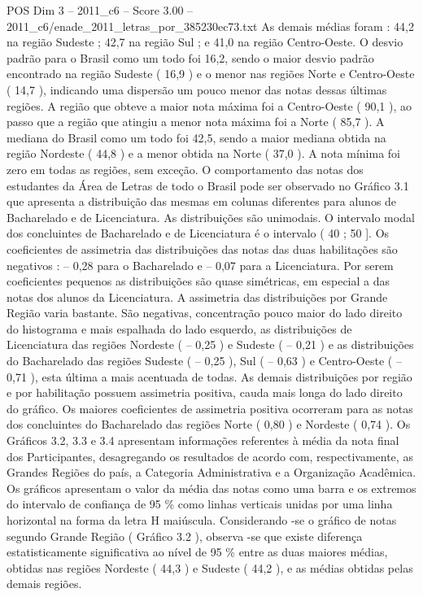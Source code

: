 \begin{textsample}{POS Dim 3 – 2011\_c6 – Score 3.00 – 2011\_c6/enade\_2011\_letras\_por\_385230ec73.txt}
As demais médias foram : 44,2 na região Sudeste ; 42,7 na região Sul ; e 41,0 na região Centro-Oeste.
O desvio padrão para o Brasil como um todo foi 16,2, sendo o maior desvio padrão encontrado na região Sudeste ( 16,9 ) e o menor nas regiões Norte e Centro-Oeste ( 14,7 ), indicando uma dispersão um pouco menor das notas dessas últimas regiões.
A região que obteve a maior nota máxima foi a Centro-Oeste ( 90,1 ), ao passo que a região que atingiu a menor nota máxima foi a Norte ( 85,7 ).
A mediana do Brasil como um todo foi 42,5, sendo a maior mediana obtida na região Nordeste ( 44,8 ) e a menor obtida na Norte ( 37,0 ).
A nota mínima foi zero em todas as regiões, sem exceção.
O comportamento das notas dos estudantes da Área de Letras de todo o Brasil pode ser observado no Gráfico 3.1 que apresenta a distribuição das mesmas em colunas diferentes para alunos de Bacharelado e de Licenciatura.
As distribuições são unimodais.
O intervalo modal dos concluintes de Bacharelado e de Licenciatura é o intervalo ( 40 ; 50 ].
Os coeficientes de assimetria das distribuições das notas das duas habilitações são negativos : – 0,28 para o Bacharelado e – 0,07 para a Licenciatura.
Por serem coeficientes pequenos as distribuições são quase simétricas, em especial a das notas dos alunos da Licenciatura.
A assimetria das distribuições por Grande Região varia bastante.
São negativas, concentração pouco maior do lado direito do histograma e mais espalhada do lado esquerdo, as distribuições de Licenciatura das regiões Nordeste ( – 0,25 ) e Sudeste ( – 0,21 ) e as distribuições do Bacharelado das regiões Sudeste ( – 0,25 ), Sul ( – 0,63 ) e Centro-Oeste ( – 0,71 ), esta última a mais acentuada de todas.
As demais distribuições por região e por habilitação possuem assimetria positiva, cauda mais longa do lado direito do gráfico.
Os maiores coeficientes de assimetria positiva ocorreram para as notas dos concluintes do Bacharelado das regiões Norte ( 0,80 ) e Nordeste ( 0,74 ).
Os Gráficos 3.2, 3.3 e 3.4 apresentam informações referentes à média da nota final dos Participantes, desagregando os resultados de acordo com, respectivamente, as Grandes Regiões do país, a Categoria Administrativa e a Organização Acadêmica.
Os gráficos apresentam o valor da média das notas como uma barra e os extremos do intervalo de confiança de 95 \% como linhas verticais unidas por uma linha horizontal na forma da letra H maiúscula.
Considerando -se o gráfico de notas segundo Grande Região ( Gráfico 3.2 ), observa -se que existe diferença estatisticamente significativa ao nível de 95 \% entre as duas maiores médias, obtidas nas regiões Nordeste ( 44,3 ) e Sudeste ( 44,2 ), e as médias obtidas pelas demais regiões.

\end{textsample}
